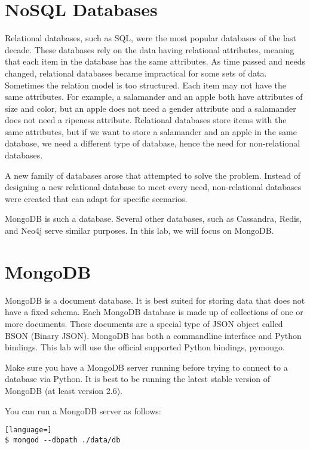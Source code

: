 \label{lab:mongodb}

\section*{NoSQL Databases}
Relational databases, such as SQL, were the most popular databases of the last decade.  These databases rely on the data having relational attributes, meaning that each item in the database has the same attributes.  As time passed and needs changed, relational databases became impractical for some sets of data.  Sometimes the relation model is too structured.  Each item may not have the same attributes.  For example, a salamander and an apple both have attributes of size and color, but an apple does not need a gender attribute and a salamander does not need a ripeness attribute.  Relational databases store items with the same attributes, but if we want to store a salamander and an apple in the same database, we need a different type of database, hence the need for non-relational databases.

A new family of databases arose that attempted to solve the problem.
Instead of designing a new relational database to meet every need, non-relational databases were created that can adapt for specific scenarios.

MongoDB is such a database.  Several other databases, such as Cassandra, Redis, and Neo4j serve similar purposes.  In this lab, we will focus on MongoDB.

\section*{MongoDB}
MongoDB is a document database.
It is best suited for storing data that does not have a fixed schema.  Each MongoDB database is made up of collections of one or more documents.
These documents are a special type of JSON object called BSON (Binary JSON).  MongoDB has both a commandline interface and Python bindings.
This lab will use the official supported Python bindings, pymongo.


\begin{info}
Make sure you have a MongoDB server running before trying to connect to a database via Python.
It is best to be running the latest stable version of MongoDB (at least version 2.6).
\end{info}

You can run a MongoDB server as follows:
\begin{lstlisting}[language=]
$ mongod --dbpath ./data/db
\end{lstlisting}

